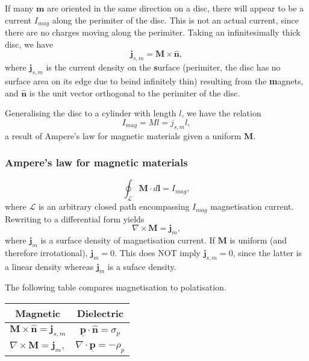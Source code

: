 \documentclass[a4paper, 12pt]{article}
\renewcommand{\vec}[1]{\mathbf{#1}}
\newcommand{\p}{\ensuremath{\vec{\underline{p}}}}
\renewcommand{\j}{\ensuremath{\vec{j}}}
\let\tmp\hat
\renewcommand{\hat}[1]{\vec{\tmp{#1}}}
\begin{document}
            If many $\vec{m}$ are oriented in the same direction on a disc, 
            there will appear to be a current $I_{mag}$ along the perimiter of the disc. 
            This is not an actual current, since there are no charges moving along the perimiter.
            Taking an infinitesimally thick disc, we have 
            \begin{equation}
                \j_{s, m} = \vec{M}\times\hat{n},
            \end{equation}
            where $\j_{s, m}$ is the current density on the \textbf{s}urface 
            (perimiter, the disc has no surface area on its edge due to beind infinitely thin) 
            resulting from the \textbf{m}agnets, and $\hat{n}$ is the unit vector orthogonal to the perimiter of the disc. 

            Generalising the disc to a cylinder with length $l$, we have the relation
            \begin{equation}
                I_{mag} = Ml = j_{s, m}l,
            \end{equation}
            a result of Ampere's law for magnetic materials given a uniform $\vec{M}$.

        \subsubsection{Ampere's law for magnetic materials}
            \begin{equation}
                \oint_\mathcal{L}\vec{M}\cdot d\vec{l} = I_{mag},
            \end{equation}
            where $\mathcal{L}$ is an arbitrary closed path encompassing $I_{mag}$ magnetisation current. 
            Rewriting to a differential form yields
            \begin{equation}
                \nabla \times \vec{M} = \j_m,
            \end{equation}
            where $\j_m$ is a surface density of magnetisation current. 
            If $\vec{M}$ is uniform (and therefore irrotational), $\j_m = 0$. 
            This does NOT imply $\j_{s, m} = 0$, since the latter is a linear density whereas $\j_m$ is a suface density.

            The following table compares magnetisation to polatisation.
            \begin{center}
                \begin{tabular}{ c|c } 
                Magnetic & Dielectric \\
                \hline
                 $\vec{M}\times\hat{n} = \j_{s, m}$ & $\p \cdot \hat{n} = \sigma_p$ \\
                 $\nabla \times \vec{M} = \j_m,$ & $\nabla \cdot \p = -\rho_p$
                \end{tabular}
            \end{center}
\end{document}
